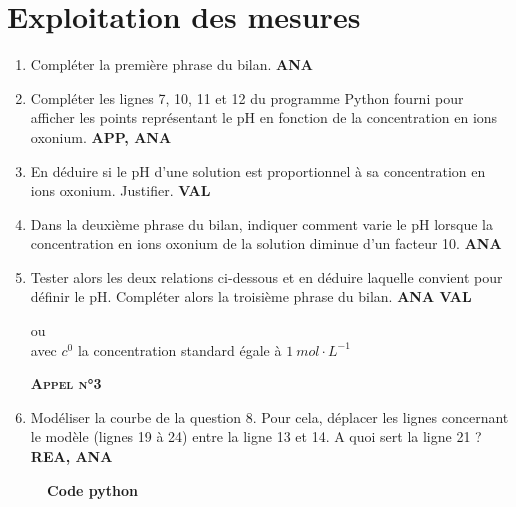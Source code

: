 \documentclass[a4paper,11pt,fleqn]{scrartcl}%
\begin{document}
\section*{Exploitation des mesures}
\begin{enumerate}[resume]
	\item Compléter la première phrase du bilan. \textcolor{gray!80!blue}{\textbf{ANA}}
	\item Compléter les lignes 7, 10, 11 et 12 du programme Python fourni pour afficher les points représentant le pH en fonction de la concentration en ions oxonium. \textcolor{gray!80!blue}{\textbf{APP, ANA}}
	\item En déduire si le pH d'une solution est proportionnel à sa concentration en ions oxonium. Justifier. \textcolor{gray!80!blue}{\textbf{VAL}}
	\item Dans la deuxième phrase du bilan, indiquer comment varie le pH lorsque la concentration en ions oxonium de la solution diminue d'un facteur 10. \textcolor{gray!80!blue}{\textbf{ANA}}
	\item Tester alors les deux relations ci-dessous et en déduire laquelle convient pour définir le pH. Compléter alors la troisième phrase du bilan. \textcolor{gray!80!blue}{\textbf{ANA VAL}}
	\begin{center}
	 ou \\
	avec $c^0$ la concentration standard égale à $1~mol\cdot L^{-1}$
	\end{center}
	\begin{center}
	\textbf{\textsc{Appel n°3}}
	\end{center}
	\item Modéliser la courbe de la question 8. Pour cela, déplacer les lignes concernant le modèle (lignes 19 à 24) entre la ligne 13 et 14. A quoi sert la ligne 21 ? \textcolor{gray!80!blue}{\textbf{REA, ANA}}
\end{enumerate}

\begin{center}
\end{center}

\begin{figure}[t]
\begin{minipage}{.6\linewidth}
	\caption{\textbf{Code python}}
	
\end{minipage}
\end{figure}
\end{document}
